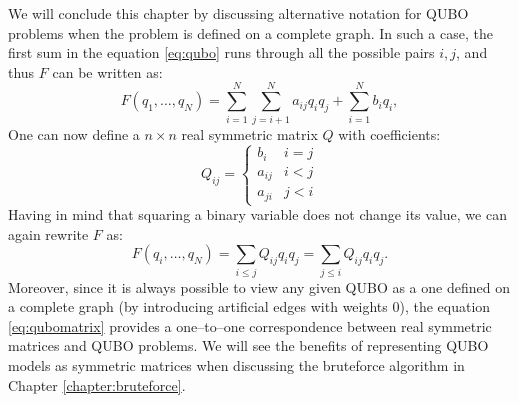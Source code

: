 We will conclude this chapter by discussing alternative notation for QUBO
problems when the problem is defined on a complete graph. In such a case, the
first sum in the equation \eqref{eq:qubo} runs through all the possible pairs
${i, j}$, and thus $F$ can be written as:
\begin{equation}
  \label{eq:qubocomplete}
  F(q_1, \ldots, q_N) =  \sum_{i=1}^N \sum_{j=i+1}^N a_{ij} q_i q_j + \sum_{i=1}^N b_iq_i,
\end{equation}
One can now define a $n \times n$ real symmetric matrix $Q$ with coefficients:
\begin{equation}
  Q_{ij} = \begin{cases}
    b_{i}  & i = j \\
    a_{ij} & i < j \\
    a_{ji} & j < i
  \end{cases}
\end{equation}
Having in mind that squaring a binary variable does not change its value, we
can again rewrite $F$ as:
\begin{equation}
  \label{eq:qubomatrix}
  F(q_{i}, \ldots, q_{N}) = \sum_{i \le j} Q_{ij} q_{i}q_{j} = \sum_{j \le i} Q_{ij} q_{i}q_{j}.
\end{equation}
Moreover, since it is always possible to view any given QUBO as a one defined
on a complete graph (by introducing artificial edges with weights 0), the
equation \eqref{eq:qubomatrix} provides a one--to--one correspondence between
real symmetric matrices and QUBO problems. We will see the benefits of
representing QUBO models as symmetric matrices when discussing the bruteforce
algorithm in Chapter \ref{chapter:bruteforce}.

